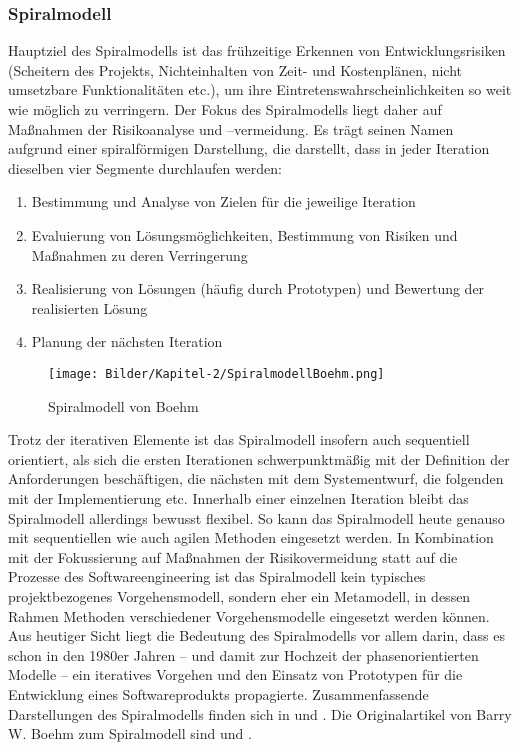 \subsubsection{Spiralmodell}
\label{sec:Kap-2.2.2.1}


Hauptziel des Spiralmodells ist das frühzeitige Erkennen von Entwicklungsrisiken (Scheitern des Projekts, Nichteinhalten von Zeit- und Kostenplänen, nicht umsetzbare Funktionalitäten etc.), um ihre Eintretenswahrscheinlichkeiten so weit wie möglich zu verringern. Der Fokus des Spiralmodells liegt daher auf Maßnahmen der Risikoanalyse und –vermeidung. Es trägt seinen Namen aufgrund einer spiralförmigen Darstellung, die darstellt, dass in jeder Iteration dieselben vier Segmente durchlaufen werden: 

\begin{enumerate}
	\item Bestimmung und Analyse von Zielen für die jeweilige Iteration
	\item Evaluierung von Lösungsmöglichkeiten, Bestimmung von Risiken und Maßnahmen zu deren Verringerung
	\item Realisierung von Lösungen (häufig durch Prototypen) und Bewertung der realisierten Lösung
	\item Planung der nächsten Iteration 
\end{enumerate}

\begin{figure}[h!]
    \centering
    \texttt{[image: Bilder/Kapitel-2/SpiralmodellBoehm.png]}
    \caption{Spiralmodell von Boehm \cite[64]{boe88}}
    \label{fig:spiralmodell_von_boehm}
\end{figure}

Trotz der iterativen Elemente ist das Spiralmodell insofern auch sequentiell orientiert, als sich die ersten Iterationen schwerpunktmäßig mit der Definition der Anforderungen beschäftigen, die nächsten mit dem Systementwurf, die folgenden mit der Implementierung etc. Innerhalb einer einzelnen Iteration bleibt das Spiralmodell allerdings bewusst flexibel. So kann das Spiralmodell heute genauso mit sequentiellen wie auch agilen Methoden eingesetzt werden. In Kombination mit der Fokussierung auf Maßnahmen der Risikovermeidung statt auf die Prozesse des Softwareengineering ist das Spiralmodell kein typisches projektbezogenes Vorgehensmodell, sondern eher ein Metamodell, in dessen Rahmen Methoden verschiedener Vorgehensmodelle eingesetzt werden können. Aus heutiger Sicht liegt die Bedeutung des Spiralmodells vor allem darin, dass es schon in den 1980er Jahren – und damit zur Hochzeit der phasenorientierten Modelle – ein iteratives Vorgehen und den Einsatz von Prototypen für die Entwicklung eines Softwareprodukts propagierte. Zusammenfassende Darstellungen des Spiralmodells finden sich in \cite[556 \psqq]{bal08} und \cite[91  \psqq]{bro13}. Die Originalartikel von Barry W. Boehm zum Spi\-ral\-mo\-dell sind \cite{boe86} und \cite{boe88}.